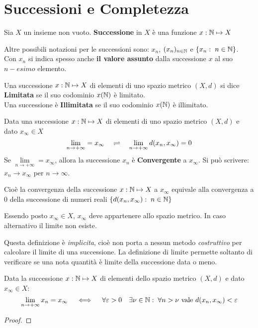 \section{Successioni e Completezza}
\begin{definition}[Successione]
	Sia $X$ un insieme non vuoto. \textbf{Successione} in $X$ è una funzione $x: \mathbb{N} \mapsto X$
	\begin{note}
		Altre possibili notazioni per le successioni sono: $x_n$, $(x_n)_{n \in \mathbb{N}}$ e $\left\{x_n:\; n \in \mathbb{N}\right\}$.\\
		Con $x_n$ si indica spesso anche \textbf{il valore assunto} dalla successione $x$ al suo $n-esimo$ elemento.
	\end{note}
\end{definition}
\begin{definition}
	Una successione $x: \mathbb{N} \mapsto X$ di elementi di uno spazio metrico $(X,d)$ si dice \textbf{Limitata} se il suo codominio $x(\mathbb{N})$ è limitato.\\
	Una successione è \textbf{Illimitata} se il suo codominio $x(\mathbb{N})$ è illimitato.
\end{definition}
\begin{definition}
	\label{def:lim_succ}
	Data una successione $x: \mathbb{N} \mapsto X$ di elementi di uno spazio metrico $(X,d)$ e dato $x_\infty \in X$
	$$\lim\limits_{n \to +\infty} = x_\infty \quad \rightleftharpoons \quad \lim\limits_{n \to +\infty} d(x_n,x_\infty) = 0$$
	Se $\lim\limits_{n \to +\infty} = x_\infty$, allora la successione $x_n$ è \textbf{Convergente} a $x_\infty$. Si può scrivere: $x_n \to x_\infty$ per $n \to \infty$.

	Cioè la convergenza della successione $x: \mathbb{N} \mapsto X$ a $x_\infty$ equivale alla convergenza a $0$ della successione di numeri reali $\left\{d(x_n,x_\infty):\; n \in \mathbb{N}\right\}$
	\begin{note}
		Essendo posto $x_\infty \in X$, $x_\infty$ deve appartenere allo spazio metrico. In caso alternativo il limite non esiste.
	\end{note}
	\begin{note}
		Questa definizione è \textit{implicita}, cioè non porta a nessun metodo \textit{costruttivo} per calcolare il limite di una successione. La definizione di limite permette soltanto di verificare se una nota quantità è limite della successione data o meno.
	\end{note}
\end{definition}
\begin{proposition}
	\label{prop:succ_conv_lim}
	Data la successione $x: \mathbb{N} \mapsto X$ di elementi dello spazio metrico $(X,d)$ e dato $x_\infty\in X$:
	$$\lim\limits_{n\rightarrow+\infty}x_n = x_\infty \quad \iff \quad \forall\varepsilon > 0 \quad \exists\nu\in\mathbb{N}:\; \forall n>\nu \text{ vale } d(x_n,x_\infty)<\varepsilon$$
	\begin{proof}
	\end{proof}
\end{proposition}
